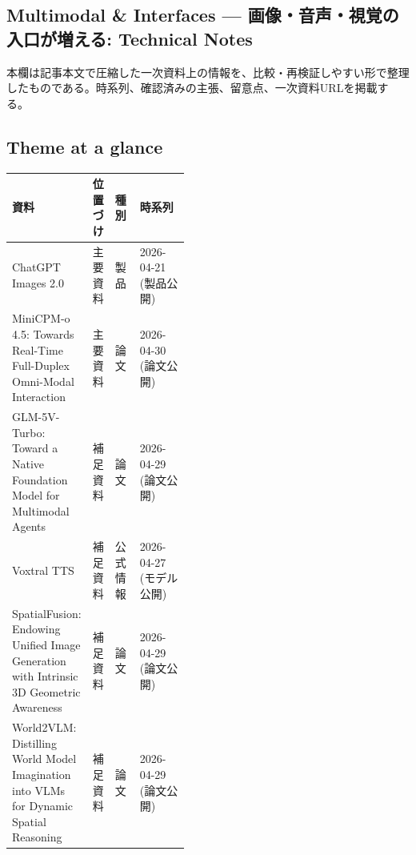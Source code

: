 \subsection*{Multimodal \& Interfaces — 画像・音声・視覚の入口が増える: Technical Notes}
本欄は記事本文で圧縮した一次資料上の情報を、比較・再検証しやすい形で整理したものである。時系列、確認済みの主張、留意点、一次資料URLを掲載する。
\medskip
\subsection*{Theme at a glance}
\begin{center}
\footnotesize
\begin{tabularx}{\linewidth}{@{}p{0.20\linewidth}p{0.10\linewidth}p{0.14\linewidth}X@{}}
\toprule
資料 & 位置づけ & 種別 & 時系列 \\
\midrule
ChatGPT Images 2.0 & 主要資料 & 製品 & 2026-04-21 (製品公開) \\
MiniCPM-o 4.5: Towards Real-Time Full-Duplex Omni-Modal Interaction & 主要資料 & 論文 & 2026-04-30 (論文公開) \\
GLM-5V-Turbo: Toward a Native Foundation Model for Multimodal Agents & 補足資料 & 論文 & 2026-04-29 (論文公開) \\
Voxtral TTS & 補足資料 & 公式情報 & 2026-04-27 (モデル公開) \\
SpatialFusion: Endowing Unified Image Generation with Intrinsic 3D Geometric Awareness & 補足資料 & 論文 & 2026-04-29 (論文公開) \\
World2VLM: Distilling World Model Imagination into VLMs for Dynamic Spatial Reasoning & 補足資料 & 論文 & 2026-04-29 (論文公開) \\
\bottomrule
\end{tabularx}
\end{center}
\normalsize

